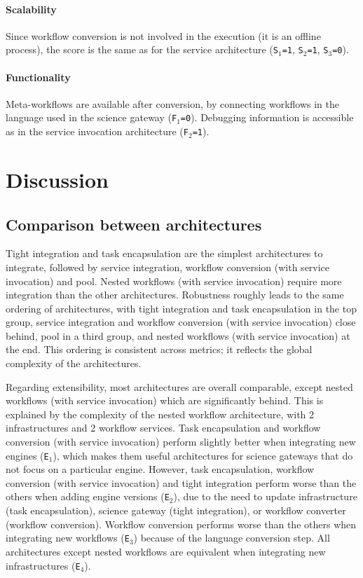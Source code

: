 \documentclass[preprint,3p,twocolumn]{elsarticle}
\newcommand{\correction}[1]{\color{blue}#1\color{black}\xspace}
\begin{document}
\paragraph{Scalability}  Since workflow conversion is not involved in
the execution (it is an offline process), the score is the same as for the
service architecture (\texttt{S$_1$=1},
\texttt{S$_2$=1}, \texttt{S$_3$=0}).

\paragraph{\correction{Functionality}} Meta-workflows are available after
conversion, by connecting workflows in the language used in the
science gateway (\texttt{\correction{F}$_1$=0}).  Debugging information is accessible
as in the service invocation architecture (\texttt{\correction{F}$_2$=1}).

\section{Discussion}
\label{sec:discussion}
\subsection{Comparison between architectures}

Tight integration and task encapsulation are the simplest
architectures to integrate, followed by service integration, workflow conversion (with
service invocation) and pool. Nested workflows (with service
invocation) require more integration than the other
architectures. Robustness roughly leads to the same ordering of
architectures, with tight integration and task encapsulation in the top
group, service integration and workflow conversion (with service
invocation) close behind, pool in a third group, and nested workflows
(with service invocation) at the end. This ordering is consistent
across metrics; it reflects the global complexity of the
architectures.

Regarding extensibility, most architectures are overall comparable,
except nested workflows (with service invocation) which are
significantly behind. This is explained by the complexity of the
nested workflow architecture, with 2 infrastructures and 2 workflow
services. Task encapsulation and workflow conversion (with service
invocation) perform slightly better when integrating new engines
(\texttt{E$_1$}), which makes them useful architectures for science
gateways that do not focus on a particular engine.  However, task encapsulation, workflow conversion (with
service invocation) and tight integration perform worse than the
others when adding engine versions (\texttt{E$_2$}), due to the need
to update infrastructure (task encapsulation), science gateway (tight
integration), or workflow converter (workflow conversion). Workflow conversion
performs worse than the others when integrating new workflows
(\texttt{E$_3$}) because of the language conversion step. All
architectures except nested workflows are equivalent when integrating
new infrastructures (\texttt{E$_4$}).
\end{document}
